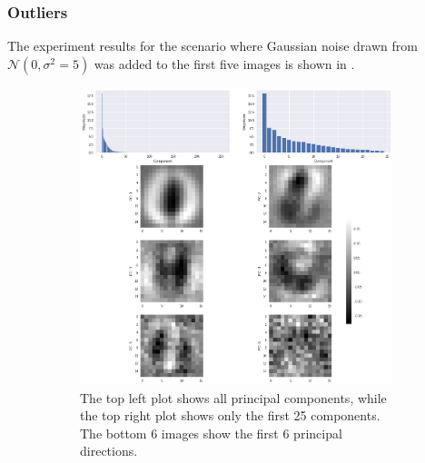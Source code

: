 \documentclass[a4paper,11pt]{article}
\begin{document}
\subsubsection*{Outliers}

The experiment results for the scenario where Gaussian noise drawn from $\mathcal{N}(0, \sigma^2=5)$ was added to the first five images is shown in .

\begin{figure}
	\centering
	\begin{subfigure}[t]{0.45\textwidth}
		\includegraphics[width=\textwidth]{images/assignment5-3-out1.png}
		\caption{The top left plot shows all principal components, while the top right plot shows only the first 25 components. The bottom 6 images show the first 6 principal directions.}
		\label{fig:assignment5-3-out1}
	\end{subfigure}
	\hfill
	\begin{subfigure}[t]{0.45\textwidth}

\end{subfigure}
\end{figure}
\end{document}
